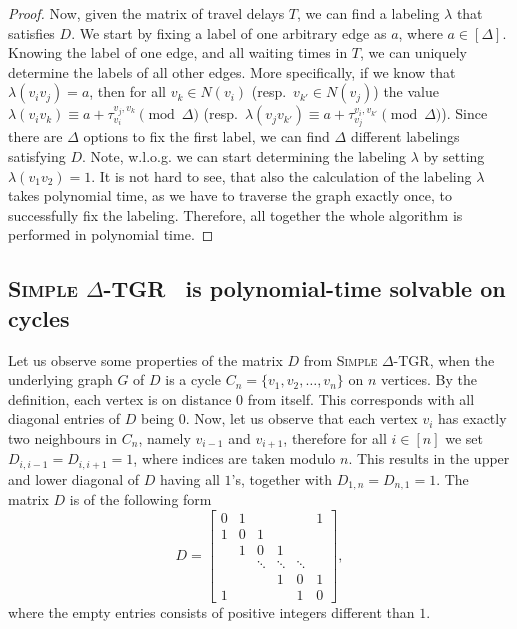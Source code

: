 \documentclass[11pt,a4paper]{article}
\theoremstyle{remark}
\theoremstyle{definition}
\newcommand{\deltaExact}{\textsc{Simple $\Delta$-TGR}}
\begin{document}
\begin{proof}
    Now, given the matrix of travel delays $T$, we can find a labeling $\lambda$ that satisfies $D$.
    We start by fixing a label of one arbitrary edge as $a$, where $a \in [\Delta]$.
    Knowing the label of one edge, and all waiting times in $T$, we can uniquely determine the labels of all other edges.
    More specifically, if we know that $\lambda(v_i v_j) = a$, then for all $v_k \in N(v_i)$ (resp.~$v_{k'} \in N(v_j)$)
    the value $\lambda(v_iv_k) \equiv a + \tau_{v_i}^{v_j,v_k} \pmod \Delta $ (resp.~$\lambda(v_j v_{k'}) \equiv a + \tau_{v_j}^{v_i,v_{k'}} \pmod \Delta $).
    Since there are $\Delta$ options to fix the first label, we can find $\Delta$ different labelings satisfying $D$.
    Note, w.l.o.g. we can start determining the labeling $\lambda$ by setting $\lambda(v_1v_2) = 1$.
    It is not hard to see, that also the calculation of the labeling $\lambda$ takes polynomial time, as we have to traverse the graph exactly once, to successfully fix the labeling. Therefore, all together the whole algorithm is performed in polynomial time.
\end{proof}

\subsection{
\texorpdfstring{\deltaExact\ } {Simple Delta-TGR}
is polynomial-time solvable on cycles}

Let us observe some properties of the matrix $D$ from \deltaExact, when the underlying graph $G$ of $D$ is a cycle $C_n = \{v_1, v_2, \dots, v_n\}$  on $n$ vertices.
By the definition, each vertex is on distance $0$ from itself. This corresponds with all diagonal entries of $D$ being $0$.
Now, let us observe that each vertex $v_i$ has exactly two neighbours in $C_n$, namely $v_{i-1}$ and $v_{i+1}$,
therefore for all $i\in [n]$ we set $D_{i,i-1} = D_{i, i+1} = 1$, where indices are taken modulo $n$.
This results in the upper and lower diagonal of $D$ having all $1$'s, together with $D_{1,n} = D_{n,1} = 1$.
The matrix $D$ is of the following form
\begin{equation} \label{eq:D-matrixForCycles}
  D = 
  \begin{bmatrix}
    0 & 1 &  &  &  & 1\\
    1 & 0 & 1 &  &  & \\
    & 1 & 0 & 1 & & \\
    & & \ddots & \ddots & \ddots &   \\
    &   & &1 &  0 & 1\\ 
    1 &  &  &  &1 &  0 
  \end{bmatrix},
\end{equation}
where the empty entries consists of positive integers different than $1$.
\end{document}
